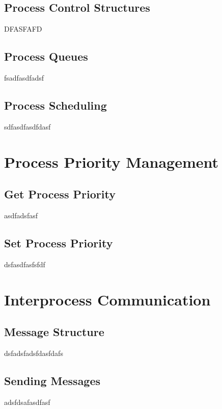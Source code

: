 \documentclass[12pt]{report}
\begin{document}
\subsection{Process Control Structures}
DFASFAFD

\subsection{Process Queues}

fsadfasdfadsf

\subsection{Process Scheduling}
sdfasdfasdfdasf


\section{Process Priority Management}

\subsection{Get Process Priority}

asdfadsfasf

\subsection{Set Process Priority}

dsfasdfasfsfdf


\section{Interprocess Communication}

\subsection{Message Structure}

dsfadsfadsfdasfdafs

\subsection{Sending Messages}

adsfdsafasdfasf
\end{document}
